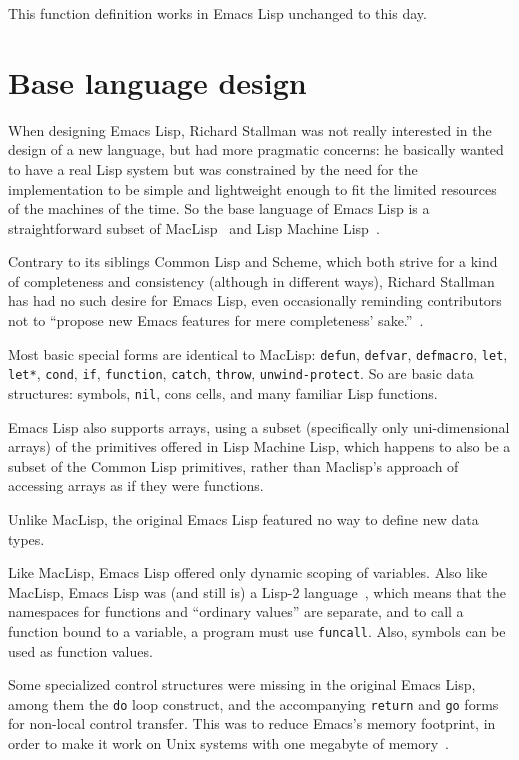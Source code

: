 \documentclass[format=acmsmall, review]{acmart}
\newcommand \Elisp {Emacs Lisp}
\begin{document}
This function definition works in \Elisp{} unchanged to this day.

\section{Base language design}
\label{sec:base-language-design}

When designing \Elisp{}, Richard Stallman was not really interested in the
design of a new language, but had more pragmatic concerns: he basically
wanted to have a real Lisp system but was constrained by the need for the
implementation to be simple and lightweight enough to fit the limited
resources of the machines of the time.  So the base language of \Elisp{} is
a straightforward subset of MacLisp~\cite{Moon1974,Pitman1983} and Lisp
Machine Lisp~\cite{WeinrebMoon1981}.

Contrary to its siblings Common Lisp and Scheme, which both strive for
a kind of completeness and consistency (although in different ways),
Richard Stallman has
had no such desire for \Elisp, even occasionally reminding contributors
not to ``propose new Emacs features for mere completeness'
sake.''~\cite{RMS-completeness}.

Most basic special forms are identical to MacLisp: \texttt{defun},
\texttt{defvar}, \texttt{defmacro}, \texttt{let}, \texttt{let*},
\texttt{cond}, \texttt{if}, \texttt{function}, \texttt{catch}, \texttt{throw},
\texttt{unwind-protect}.  So are basic data structures: symbols,
\texttt{nil}, cons cells, and many familiar Lisp functions.

\Elisp{} also supports arrays, using a subset (specifically only uni-dimensional
arrays) of the primitives offered in Lisp Machine Lisp, which happens to
also be a subset of the Common Lisp primitives, rather than Maclisp's
approach of accessing arrays as if they were functions.

Unlike MacLisp, the original \Elisp{} featured no way to define new
data types.


Like MacLisp, \Elisp{} offered only
dynamic scoping of variables.  Also like MacLisp, \Elisp{} was (and still is) a Lisp-2
language~\cite{SteeleGabriel1993}, which means that the namespaces for
functions and ``ordinary values'' are separate, and to call a function bound
to a variable, a program must use \texttt{funcall}.  Also, symbols can be
used as function values.

Some specialized control structures were missing in the original
\Elisp{}, among them the \texttt{do} loop construct, and the
accompanying \texttt{return} and \texttt{go} forms for non-local
control transfer.  This was to reduce Emacs's memory footprint, in
order to make it work on Unix systems with one megabyte of memory~\cite{Stallman2018-personal}.
\end{document}
